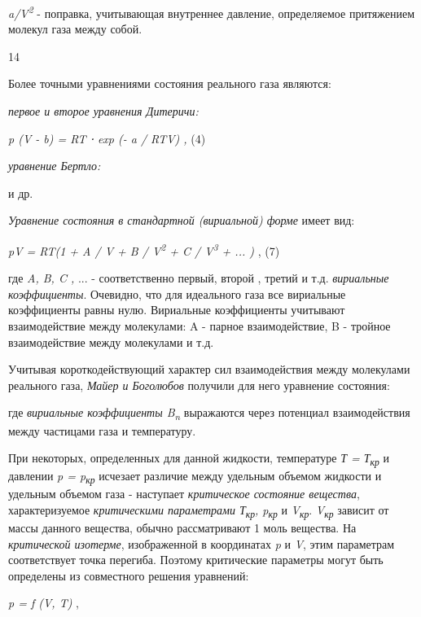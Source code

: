 \emph{a/V\textsuperscript{2}} - поправка, учитывающая внутреннее
давление, определяемое притяжением молекул газа между собой.

14

Более точными уравнениями состояния реального газа являются:

\emph{первое и второе уравнения Дитеричи:}

\emph{p (V - b) = RT ⋅ exp (- a / RTV) ,} (4)


\emph{уравнение Бертло:}


и др.

\emph{Уравнение состояния в стандартной (вириальной) форме} имеет вид:

\emph{pV = RT(1 + A / V + B / V\textsuperscript{2} + C /
V\textsuperscript{3} + ... )} , (7)

где \emph{A, B, C ,} ... - соответственно первый, второй , третий и т.д.
\emph{вириальные} \emph{коэффициенты}. Очевидно, что для идеального газа
все вириальные коэффициенты равны нулю. Вириальные коэффициенты
учитывают взаимодействие между молекулами: A - парное взаимодействие, B
- тройное взаимодействие между молекулами и т.д.

Учитывая короткодействующий характер сил взаимодействия между молекулами
реального газа, \emph{Майер и Боголюбов} получили для него уравнение
состояния:


где \emph{вириальные коэффициенты B\textsubscript{n}} выражаются через
потенциал взаимодействия между частицами газа и температуру.

При некоторых, определенных для данной жидкости, температуре \emph{Т =
Т\textsubscript{кр}} и давлении \emph{p = p\textsubscript{кр}} исчезает
различие между удельным объемом жидкости и удельным объемом газа -
наступает \emph{критическое состояние вещества}, характеризуемое
\emph{критическими параметрами Т\textsubscript{кр}, p\textsubscript{кр}}
и \emph{V\textsubscript{кр}}. \emph{V\textsubscript{кр}} зависит от
массы данного вещества, обычно рассматривают 1 моль вещества. На
\emph{критической изотерме}, изображенной в координатах \emph{p} и
\emph{V}, этим параметрам соответствует точка перегиба. Поэтому
критические параметры могут быть определены из совместного решения
уравнений:

\emph{p = f (V, T)} , %

